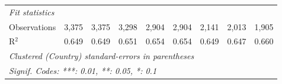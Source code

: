 \begin{tabular}{lcccccccc}
   \midrule \emph{Fit statistics}\\
   Observations                                              & 3,375          & 3,375          & 3,298         & 2,904         & 2,904         & 2,141        & 2,013         & 1,905\\  
   R$^2$                                                     & 0.649          & 0.649          & 0.651         & 0.654         & 0.654         & 0.649        & 0.647         & 0.660\\  
   \midrule
   \multicolumn{9}{l}{\emph{Clustered (Country) standard-errors in parentheses}}\\
   \multicolumn{9}{l}{\emph{Signif. Codes: ***: 0.01, **: 0.05, *: 0.1}}\\
\end{tabular}
\par\endgroup


